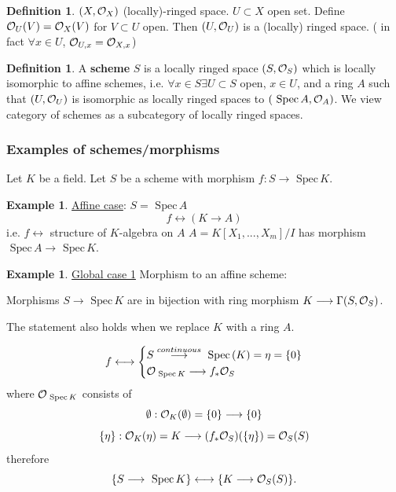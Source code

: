 \documentclass[11pt]{article}
\theoremstyle{definition}
\newtheorem{dfn}[thm]{Definition}
\newtheorem{ex}[thm]{Example}
\newcommand{\spec}{\text{ Spec}\,}
\newcommand{\calo}{{\cal O}}
\newcommand{\lrta}{\longrightarrow}
\newcommand{\llrta}{\longleftrightarrow}
\begin{document}
\begin{dfn}
$(X,\calo_X)$ (locally)-ringed space. $U\subset X$ open set.  Define $\calo_U(V)=\calo_X(V)$ for $V\subset U$ open.  Then $(U,\calo_U)$ is a (locally) ringed space. ( in fact $\forall x\in U$, $\calo_{U,x}=\calo_{X,x}$)
\end{dfn}
\begin{dfn}
A \textbf{scheme} $S$ is a locally ringed space $(S,\calo_S)$  which is locally isomorphic to affine schemes, i.e.
 $\forall x\in S\exists U\subset S$  open, $x\in U$, and a ring $A$ such that $(U,\calo_U)$ is isomorphic as locally ringed spaces to $(\spec A,\calo_A)$. We view category of schemes as a subcategory of locally ringed spaces.
\end{dfn}
\subsubsection{ Examples of schemes/morphisms}

Let $K$ be a field. Let $S$ be a scheme with morphism $f:S\lrta \spec K$.

\begin{ex}
\underline{Affine case}: $S=\spec A$
$$
f\llrta (K\lrta A)
$$ 
i.e. $f\llrta$ structure of $K$-algebra on $A$
$A=K[X_1,...,X_m]/I$ has  morphism $\spec A\lrta\spec K$. 
\end{ex}
\begin{ex}
\underline{Global case 1} Morphism to an affine scheme: 

Morphisms $S\lrta \spec K$ are in bijection with ring morphism $K\lrta \Gamma(S,\calo_S)$.

The statement also holds when we replace $K$ with a ring $A$.

$$
f\llrta\left\{\begin{aligned}
& S\overset{continuous}{\lrta}\spec (K)=\eta=\{0\}\\
& \calo_{\spec K}\lrta f_*\calo_S
\end{aligned}\right.
$$
where $\calo_{\spec K}$ consists of 
$$
\emptyset :\calo_{K}(\emptyset)=\{0\}\lrta \{0\}
$$
$$
\{\eta\}:\calo_K(\eta)=K\lrta (f_*\calo_S)(\{\eta\})=\calo_S(S)
$$
therefore
$$
\{S\lrta \spec K\}\llrta \{K\lrta \calo_S(S)\}.
$$
\end{ex}
\end{document}
